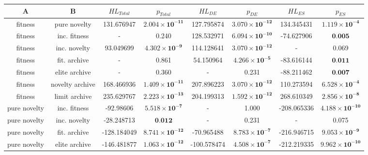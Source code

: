 \begin{tabular}{cccccccc}
\toprule
              A &               B & ${HL}_{Total}$ &                      $p_{Total}$ & ${HL}_{DE}$ &                         $p_{DE}$ & ${HL}_{ES}$ &                         $p_{ES}$ \\
\midrule
        fitness &    pure novelty &     131.676947 & $\mathbf{2.004 \times 10^{-11}}$ &  127.795874 & $\mathbf{3.070 \times 10^{-12}}$ &  134.345431 &  $\mathbf{1.119 \times 10^{-4}}$ \\
        fitness &    inc. fitness &              - &                            0.240 &  128.532971 & $\mathbf{6.094 \times 10^{-10}}$ &  -74.627906 &                 $\textbf{0.005}$ \\
        fitness &    inc. novelty &      93.049699 &  $\mathbf{4.302 \times 10^{-9}}$ &  114.128641 & $\mathbf{3.070 \times 10^{-12}}$ &           - &                            0.069 \\
        fitness &    fit. archive &              - &                            0.861 &   54.150964 &  $\mathbf{4.266 \times 10^{-5}}$ &  -83.616144 &                 $\textbf{0.011}$ \\
        fitness &   elite archive &              - &                            0.360 &           - &                            0.231 &  -88.211462 &                 $\textbf{0.007}$ \\
        fitness & novelty archive &     168.466936 & $\mathbf{1.409 \times 10^{-11}}$ &  207.896223 & $\mathbf{3.070 \times 10^{-12}}$ &  110.273594 &  $\mathbf{6.528 \times 10^{-4}}$ \\
        fitness &   limit archive &     235.629767 & $\mathbf{2.223 \times 10^{-13}}$ &  204.199313 & $\mathbf{1.592 \times 10^{-12}}$ &  268.610349 &  $\mathbf{2.856 \times 10^{-8}}$ \\
   pure novelty &    inc. fitness &      -92.98606 &  $\mathbf{5.518 \times 10^{-7}}$ &           - &                            1.000 & -208.065336 & $\mathbf{4.188 \times 10^{-10}}$ \\
   pure novelty &    inc. novelty &     -28.248713 &                 $\textbf{0.012}$ &           - &                            0.231 &           - &                            0.075 \\
   pure novelty &    fit. archive &    -128.184049 & $\mathbf{8.741 \times 10^{-12}}$ &  -70.965488 &  $\mathbf{8.783 \times 10^{-7}}$ & -216.946715 &  $\mathbf{9.053 \times 10^{-9}}$ \\
   pure novelty &   elite archive &    -146.481877 & $\mathbf{1.063 \times 10^{-12}}$ & -100.578474 &  $\mathbf{4.508 \times 10^{-7}}$ & -212.219335 & $\mathbf{9.962 \times 10^{-10}}$ \\

\end{tabular}
